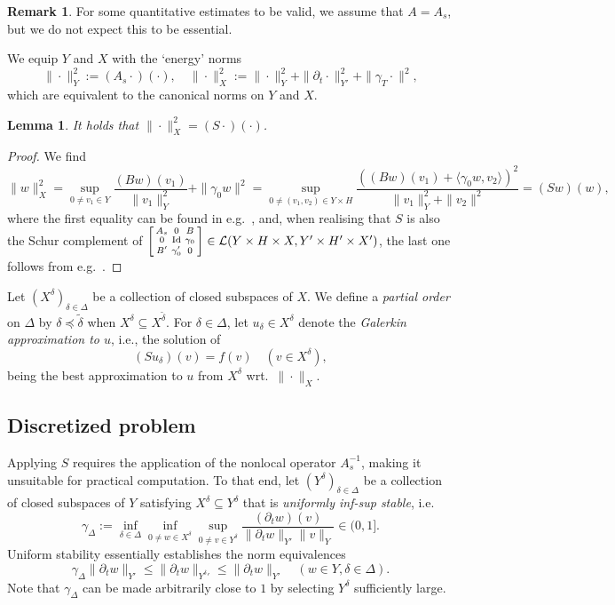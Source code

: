 \documentclass[11pt,a4paper,oneside,english]{amsart}
\numberwithin{equation}{section}
\numberwithin{theorem}{section}
\newtheorem{lemma}[theorem]{Lemma}
\theoremstyle{definition}
\newtheorem{remark}[theorem]{Remark}
\newcommand{\la}{\langle}
\newcommand{\ra}{\rangle}
\DeclareMathOperator*{\Id}{Id}
\newcommand{\cL}{\mathcal L}
\newcommand{\jw}[1]{{\color{red}{JW: #1}}}
\begin{document}
\begin{remark}
  For some quantitative estimates to be valid, we assume that $A=A_s$, but we do not expect this to be essential.
\end{remark}
We equip $Y$ and $X$ with the `energy' norms
$$
\|\cdot\|_Y^2:=(A_s\cdot)(\cdot),\quad \|\cdot\|_X^2:=\|\cdot\|_Y^2+\|\partial_t \cdot\|_{Y'}^2+\|\gamma_T \cdot\|^2,
$$
which are equivalent to the canonical norms on $Y$ and $X$.

\begin{lemma}
  \label{lem:energy-norm}
  It holds that $\|\cdot\|_X^2=(S\cdot)(\cdot)$.
\end{lemma}
\begin{proof}
  We find \jw{dit ben ik nog niet nagegaan}
  \[
    \|w\|_X^2=\sup_{0 \neq v_1 \in Y} \frac{(B w)(v_1)}{\|v_1\|_Y^2}+\|\gamma_0 w\|^2
    =\sup_{0 \neq (v_1,v_2) \in Y \times H} \frac{((B w)(v_1)+\la \gamma_0 w,v_2\ra)^2}{\|v_1\|_Y^2+\|v_2\|^2} =(Sw)(w),
  \]
  where the first equality can be found in e.g.~\cite[Thm.~2.1]{Ern2017a}, and,
  when realising that $S$ is also the Schur complement of
  $\begin{bsmallmatrix} A_s & 0 & B\\ 0 & \Id & \gamma_0\\ B' & \gamma_0' & 0\end{bsmallmatrix} \in \cL(Y\times H \times X, Y'\times H'\times X')$, the last one follows from e.g.~\cite[Lemma~2.2]{Kondratyuk2008}.
\end{proof}

Let $(X^\delta)_{\delta \in \Delta}$ be a collection of closed subspaces of $X$.
We define a \emph{partial order} on $\Delta$ by $\delta \preceq \tilde{\delta}$
when $X^\delta \subseteq X^{\tilde{\delta}}$. For $\delta \in \Delta$, let
$u_\delta \in X^\delta$ denote the {\em Galerkin approximation to $u$}, i.e., the solution of
\begin{equation}
(Su_\delta)(v)=f(v) \quad (v \in X^\delta),
  \label{eqn:galerkin}
\end{equation}
being the best approximation to $u$ from $X^\delta$ wrt.~$\|\cdot\|_X$.

\subsection{Discretized problem}
Applying $S$ requires the application of the nonlocal operator $A_s^{-1}$, making it
unsuitable for practical computation. To that end, let $(Y^\delta)_{\delta \in \Delta}$
be a collection of closed subspaces of $Y$ satisfying $X^\delta \subseteq Y^\delta$
that is \emph{uniformly inf-sup stable}, i.e.
\begin{equation}
  \gamma_\Delta:=\inf_{\delta \in \Delta}\inf_{0 \neq w \in X^\delta}\sup_{0\neq v \in Y^\delta} \frac{(\partial_t w)(v)}{\|\partial_t w\|_{Y'}\|v\|_Y} \in (0,1].
  \label{eqn:infinfsup}
\end{equation}
Uniform stability essentially establishes the norm equivalences
\[
  \gamma_\Delta \|\partial_t w\|_{Y'} \leq \|\partial_t w\|_{{Y^\delta}'} \leq \|\partial_t w\|_{Y'} \quad (w \in Y, \delta \in \Delta).
\]
Note that $\gamma_\Delta$ can be made arbitrarily close to $1$ by selecting $Y^\delta$ sufficiently large.
\end{document}
